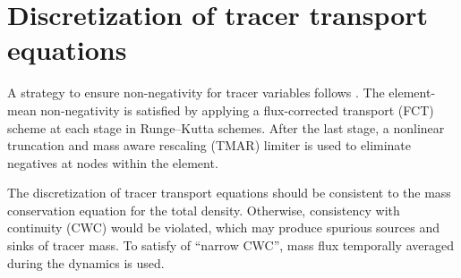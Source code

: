 \section{Discretization of tracer transport equations}
A strategy to ensure non-negativity for tracer variables follows \citet{LightPreserving2016}.
The element-mean non-negativity is satisfied by applying a flux-corrected transport (FCT) scheme at each stage in Runge--Kutta schemes. 
After the last stage, 
a nonlinear truncation and mass aware rescaling (TMAR) limiter is used to eliminate negatives at nodes within the element.


The discretization of tracer transport equations should be consistent to the mass conservation equation for the total density. 
Otherwise, consistency with continuity (CWC) would be violated, which may produce spurious sources and sinks of tracer mass.
To satisfy of ``narrow CWC'',  mass flux temporally averaged during the dynamics is used.
